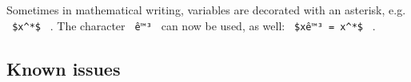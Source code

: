 \begin{Shaded}
\begin{Highlighting}[]

\NormalTok{\textasciigrave{}\textasciigrave{}\textasciigrave{})}


\NormalTok{\textasciigrave{}\textasciigrave{}\textasciigrave{}}
\end{Highlighting}
\end{Shaded}

\pandocbounded{}

Sometimes in mathematical writing, variables are decorated with an
asterisk, e.g. \texttt{\ \$x\^{}*\$\ } . The character \texttt{\ ê™³\ }
can now be used, as well: \texttt{\ \$xê™³\ =\ x\^{}*\$\ } .

\subsection{Known issues}\label{known-issues}

